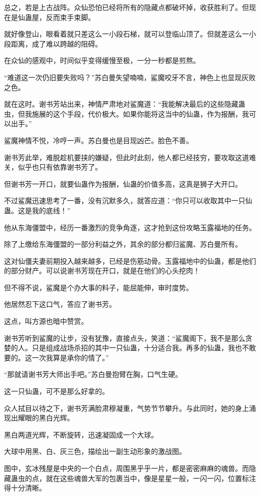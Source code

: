 \begin{this_body}
总之，若是上古战阵。众仙恐怕已经将所有的隐藏点都破坏掉，收获胜利了。但现在是仙蛊屋，反而束手束脚。

就好像登山，眼看着就只差这么一小段石梯，就可以登临山顶了。但就差这么一小段距离，成了难以跨越的阻碍。

在众仙的感观中，时间似乎变得缓慢至极，一分一秒都是煎熬。

“难道这一次仍旧要失败吗？”苏白曼失望喃喃，鲨魔咬牙不言，神色上也显现灰败之色。

就在这时。谢书芳站出来，神情严肃地对鲨魔道：“我能解决最后的这些隐藏蛊虫，但我施展的这个手段，代价极大。如果你能将这当中的仙蛊，作为报酬，我可以出手。”

鲨魔神情不悦，冷哼一声。苏白曼也是目现凶芒。脸色不善。

谢书芳此举，难脱趁机要挟的嫌疑，但此时此刻，他人都已经技穷，要攻取这道难关，似乎也只有依靠谢书芳了。

但谢书芳一开口，就要仙蛊作为报酬，仙蛊的价值多高，这真是狮子大开口。

不过鲨魔迅速思考了一番，没有沉默多久，就答应道：“你只可以收取其中一只仙蛊。这是我的底线！”

他从东海僵盟中，经历一番激烈的竞争角逐，这才抢到这份攻略玉露福地的任务。

除了上缴给东海僵盟的一部分利益之外，其余的部分都归鲨魔、苏白曼所有。

这对仙僵夫妻前期投入越来越多，已经是伤筋动骨。玉露福地中的仙蛊，都是他们的部分财产。可以说谢书芳现在开口，就是在他们的心头挖肉！

但不得不说，鲨魔是个办大事的料子，能屈能伸，审时度势。

他居然忍下这口气，答应了谢书芳。

这点，叫方源也暗中赞赏。

谢书芳听到鲨魔的让步，没有犹豫，直接点头，笑道：“鲨魔阁下，我不是那么贪婪的人。只是组成战场杀招的其中一只仙蛊，十分适合我。再多的仙蛊，我也不敢要的。这一次我算是承你的情了。”

“那就请谢书芳大师出手吧。”苏白曼抱臂在胸，口气生硬。

这一只仙蛊，可不是那么好拿的。

众人拭目以待之下，谢书芳满脸肃穆凝重，气势节节攀升。与此同时，她的身上涌现出耀眼的黑白光辉。

黑白两道光辉，不断旋转，迅速凝固成一个大球。

大球中用黑、白、灰三色，描绘出一副生动形象的激战图。

图中，玄冰残屋是中央的一个白点，周围黑乎乎一片，都是密密麻麻的魂兽。而隐藏蛊虫的点，就在这些魂兽大军的包裹当中，像是星星一般，一闪一闪，位置标注得十分清晰。


\end{this_body}
